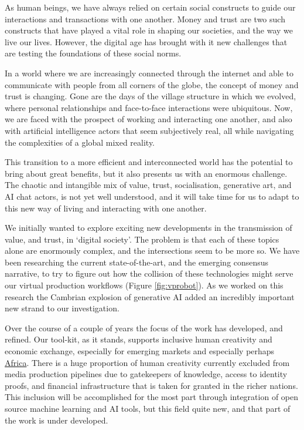 As human beings, we have always relied on certain social constructs to guide our interactions and transactions with one another. Money and trust are two such constructs that have played a vital role in shaping our societies, and the way we live our lives. However, the digital age has brought with it new challenges that are testing the foundations of these social norms.\par
In a world where we are increasingly connected through the internet and able to communicate with people from all corners of the globe, the concept of money and trust is changing. Gone are the days of the village structure in which we evolved, where personal relationships and face-to-face interactions were ubiquitous. Now, we are faced with the prospect of working and interacting one another, and also with artificial intelligence actors that seem subjectively real, all while navigating the complexities of a global mixed reality.\par
This transition to a more efficient and interconnected world has the potential to bring about great benefits, but it also presents us with an enormous challenge. The chaotic and intangible mix of value, trust, socialisation, generative art, and AI chat actors, is not yet well understood, and it will take time for us to adapt to this new way of living and interacting with one another.\par
We initially wanted to explore exciting new developments in the transmission of value, and trust, in `digital society'. The problem is that each of these topics alone are enormously complex, and the intersections seem to be more so. We have been researching the current state-of-the-art, and the emerging consensus narrative, to try to figure out how the collision of these technologies might serve our virtual production workflows (Figure \ref{fig:vprobot}). As we worked on this research the Cambrian explosion of generative AI added an incredibly important new strand to our investigation.\par
Over the course of a couple of years the focus of the work has developed, and refined. Our tool-kit, as it stands, supports inclusive human creativity and economic exchange, especially for emerging markets and especially perhaps \href{https://www.afrobitcoin.org/}{Africa}. There is a huge proportion of human creativity currently excluded from media production pipelines due to gatekeepers of knowledge, access to identity proofs, and financial infrastructure that is taken for granted in the richer nations. This inclusion will be accomplished for the most part through integration of open source machine learning and AI tools, but this field quite new, and that part of the work is under developed.\par

